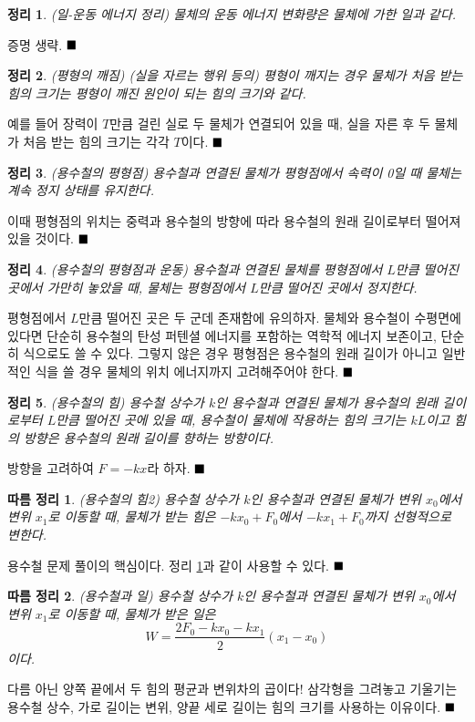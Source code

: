 \documentclass{article}
\newtheorem{theorem}{정리}
\newtheorem{corollary}{따름 정리}
\newcommand{\qed}{$\hfill\blacksquare$}
\begin{document}
\begin{theorem}\label{theorem:6}
	(일-운동 에너지 정리) 물체의 운동 에너지 변화량은 물체에 가한 일과 같다.
\end{theorem}
증명 생략.
\qed

\begin{theorem}
	(평형의 깨짐) (실을 자르는 행위 등의) 평형이 깨지는 경우 물체가 처음 받는 힘의 크기는 평형이 깨진 원인이 되는 힘의 크기와 같다.
\end{theorem}
예를 들어 장력이 $T$만큼 걸린 실로 두 물체가 연결되어 있을 때, 실을 자른 후 두 물체가 처음 받는 힘의 크기는 각각 $T$이다.
\qed

\begin{theorem}
	(용수철의 평형점) 용수철과 연결된 물체가 평형점에서 속력이 0일 때 물체는 계속 정지 상태를 유지한다.
\end{theorem}
이때 평형점의 위치는 중력과 용수철의 방향에 따라 용수철의 원래 길이로부터 떨어져 있을 것이다.
\qed
\begin{theorem}
	(용수철의 평형점과 운동) 용수철과 연결된 물체를 평형점에서 $L$만큼 떨어진 곳에서 가만히 놓았을 때, 물체는 평형점에서 $L$만큼 떨어진 곳에서 정지한다.
\end{theorem}
평형점에서 $L$만큼 떨어진 곳은 두 군데 존재함에 유의하자. 물체와 용수철이 수평면에 있다면 단순히 용수철의 탄성 퍼텐셜 에너지를 포함하는 역학적 에너지 보존이고, 단순히 식으로도 쓸 수 있다. 그렇지 않은 경우 평형점은 용수철의 원래 길이가 아니고 일반적인 식을 쓸 경우 물체의 위치 에너지까지 고려해주어야 한다.
\qed

\begin{theorem}
	(용수철의 힘) 용수철 상수가 $k$인 용수철과 연결된 물체가 용수철의 원래 길이로부터 $L$만큼 떨어진 곳에 있을 때, 용수철이 물체에 작용하는 힘의 크기는 $kL$이고 힘의 방향은 용수철의 원래 길이를 향하는 방향이다.
\end{theorem}
방향을 고려하여 $F=-kx$라 하자.
\qed
\begin{corollary}
	(용수철의 힘2) 용수철 상수가 $k$인 용수철과 연결된 물체가 변위 $x_0$에서 변위 $x_1$로 이동할 때, 물체가 받는 힘은 $-kx_0 + F_0$에서 $-kx_1 + F_0$까지 선형적으로 변한다.
\end{corollary}
용수철 문제 풀이의 핵심이다. 정리 \ref{theorem:6}과 같이 사용할 수 있다. 
\qed
\begin{corollary}
	(용수철과 일) 용수철 상수가 $k$인 용수철과 연결된 물체가 변위 $x_0$에서 변위 $x_1$로 이동할 때, 물체가 받은 일은
	\begin{equation}
		W = \frac{2F_0 - kx_0 - kx_1}{2}(x_1 - x_0)
	\end{equation}
	이다.
\end{corollary}
다름 아닌 양쪽 끝에서 두 힘의 평균과 변위차의 곱이다! 삼각형을 그려놓고 기울기는 용수철 상수, 가로 길이는 변위, 양끝 세로 길이는 힘의 크기를 사용하는 이유이다.
\qed
\end{document}
